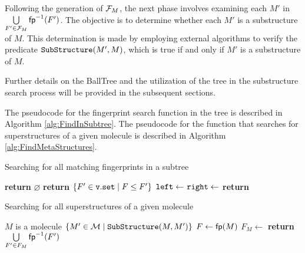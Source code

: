 Following the generation of $\mathcal{F}_M$, the next phase involves examining each $M'$ in $\bigcup\limits_{F' \in \mathcal{F}_M} {\sf fp}^{-1}(F')$. The objective is to determine whether each $M'$ is a substructure of $M$. This determination is made by employing external algorithms to verify the predicate $\verb|SubStructure|(M', M)$, which is true if and only if $M'$ is a substructure of $M$. 

Further details on the BallTree and the utilization of the tree in the substructure search process will be provided in the subsequent sections.



The pseudocode for the fingerprint search function in the tree is described in Algorithm \ref{alg:FindInSubtree}. The pseudocode for the function that searches for superstructures of a given molecule is described in Algorithm \ref{alg:FindMetaStructures}.

\begin{algorithm}[h!]
  \caption{Searching for all matching fingerprints in a subtree}\label{alg:FindInSubtree}
  \begin{algorithmic}[1]
     \label{alg:FindInSubtree:line:RecursionCut}
      \State \textbf{return} $\varnothing$
      \State \textbf{return} $\{F' \in {\tt v.set} \mid F \le F' \}$ 
    \Else
      \State ${\tt left} \gets $   
      \State ${\tt right} \gets $  
      \State \textbf{return}  
    \EndIf
    \EndProcedure
  \end{algorithmic}
\end{algorithm}

\begin{algorithm}[!ht]
  \caption{Searching for all superstructures of a given molecule} \label{alg:FindMetaStructures}
  \begin{algorithmic}[1]
    \Require $M $ is a molecule 
    \Ensure $\{M' \in \mathcal{M} \mid {\tt SubStructure}(M, M') \}$ 
    \State $F \gets {\sf fp}(M) $ 
    \State $F_M \gets $ 
    \State \textbf{return} $\bigcup\limits_{F' \in F_M} {\sf fp}^{-1}(F')$  
    \EndProcedure
  \end{algorithmic}
\end{algorithm}

